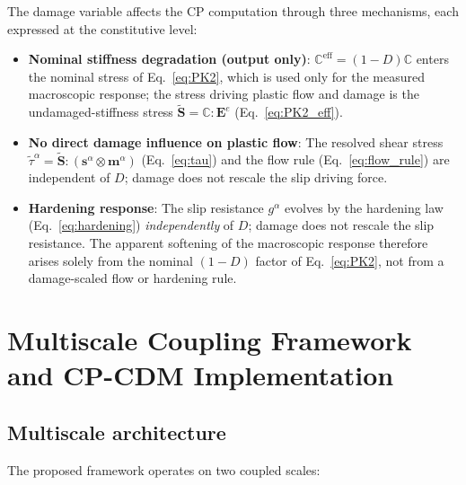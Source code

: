 \documentclass[twocolumn]{sagej}
\begin{document}
The damage variable affects the CP computation through three mechanisms, each expressed at the constitutive level:
\begin{itemize}
    \item \textbf{Nominal stiffness degradation (output only)}: $\mathbb{C}^{\text{eff}} = (1-D)\mathbb{C}$ enters the nominal stress of Eq.~\eqref{eq:PK2}, which is used only for the measured macroscopic response; the stress driving plastic flow and damage is the undamaged-stiffness stress $\tilde{\mathbf{S}} = \mathbb{C}:\mathbf{E}^e$ (Eq.~\eqref{eq:PK2_eff}).
    \item \textbf{No direct damage influence on plastic flow}: The resolved shear stress $\tilde{\tau}^\alpha = \tilde{\mathbf{S}}:(\mathbf{s}^\alpha\otimes\mathbf{m}^\alpha)$ (Eq.~\eqref{eq:tau}) and the flow rule (Eq.~\eqref{eq:flow_rule}) are independent of $D$; damage does not rescale the slip driving force.
    \item \textbf{Hardening response}: The slip resistance $g^\alpha$ evolves by the hardening law (Eq.~\eqref{eq:hardening}) \emph{independently} of $D$; damage does not rescale the slip resistance. The apparent softening of the macroscopic response therefore arises solely from the nominal $(1-D)$ factor of Eq.~\eqref{eq:PK2}, not from a damage-scaled flow or hardening rule.
\end{itemize}

\section{Multiscale Coupling Framework and CP-CDM Implementation}
\label{sec:multiscale}

\subsection{Multiscale architecture}

The proposed framework operates on two coupled scales:
\end{document}
